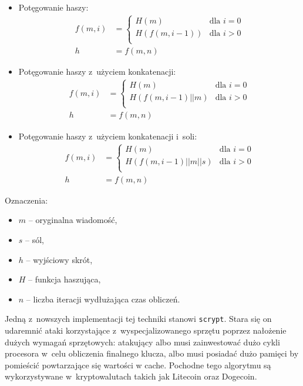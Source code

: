 \begin{itemize}
    \item Potęgowanie haszy:
    \[
        \begin{aligned}
        f(m, i) &=
            \begin{cases}
                H(m) & \mbox{dla } i = 0 \\
                H(f(m, i - 1)) & \mbox{dla } i > 0 \\
            \end{cases}
        \\
        h &= f(m, n)
        \end{aligned}
    \]

    \item Potęgowanie haszy z~użyciem konkatenacji:
    \[
        \begin{aligned}
        f(m, i) &=
            \begin{cases}
                H(m) & \mbox{dla } i = 0 \\
                H(f(m, i - 1) || m) & \mbox{dla } i > 0 \\
            \end{cases}
        \\
        h &= f(m, n)
        \end{aligned}
    \]

    \item Potęgowanie haszy z~użyciem konkatenacji i~soli:
    \[
        \begin{aligned}
        f(m, i) &=
            \begin{cases}
                H(m) & \mbox{dla } i = 0 \\
                H(f(m, i - 1) || m || s) & \mbox{dla } i > 0 \\
            \end{cases}
        \\
        h &= f(m, n)
        \end{aligned}
    \]

\end{itemize}

Oznaczenia:
\begin{itemize}
    \item $m$ -- oryginalna wiadomość,
    \item $s$ -- sól,
    \item $h$ -- wyjściowy skrót,
    \item $H$ -- funkcja haszująca,
    \item $n$ -- liczba iteracji wydłużająca czas obliczeń.
\end{itemize}

Jedną z~nowszych implementacji tej techniki stanowi \texttt{scrypt}. Stara się
on udaremnić ataki korzystające z~wyspecjalizowanego sprzętu poprzez nałożenie
dużych wymagań sprzętowych: atakujący albo musi zainwestować dużo cykli
procesora w~celu obliczenia finalnego klucza, albo musi posiadać dużo pamięci
by pomieścić powtarzające się wartości w cache. Pochodne tego algorytmu są
wykorzystywane w~kryptowalutach takich jak Litecoin oraz Dogecoin.
